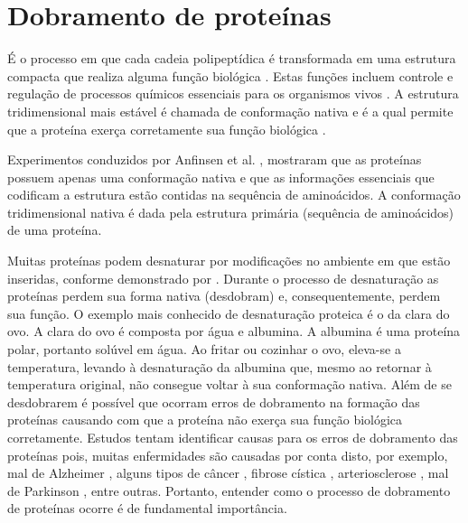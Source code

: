 
\section{Dobramento de proteínas}

É o processo em que cada cadeia polipeptídica é transformada em uma estrutura compacta que realiza alguma função biológica \cite{grantcharova2001mechanisms}. Estas funções incluem controle e regulação de processos químicos essenciais para os organismos vivos \cite{branden1999introduction}. A estrutura tridimensional mais estável é chamada de conformação nativa e é a qual permite que a proteína exerça corretamente sua função biológica \cite{lodish2000molecular, pedersen2000algorithms}.

Experimentos conduzidos por Anfinsen et al. \cite{sela1957reductive, anfinsen1972studies, anfinsen1961kinetics}, mostraram que as proteínas possuem apenas uma conformação nativa e que as informações essenciais que codificam a estrutura estão contidas na sequência de aminoácidos. A conformação tridimensional nativa é dada pela estrutura primária (sequência de aminoácidos) de uma proteína.

Muitas proteínas podem desnaturar por modificações no ambiente em que estão inseridas, conforme demonstrado por \cite{sela1957reductive, anfinsen1972studies, anfinsen1961kinetics}. Durante o processo de desnaturação as proteínas perdem sua forma nativa (desdobram) e, consequentemente, perdem sua função. O exemplo mais conhecido de desnaturação proteica é o da clara do ovo. A clara do ovo é composta por água e albumina. A albumina é uma proteína polar, portanto solúvel em 
água. Ao fritar ou cozinhar o ovo, eleva-se a temperatura, levando à desnaturação da albumina que, mesmo ao retornar à temperatura original, não consegue voltar à sua conformação nativa. Além de se desdobrarem é possível que ocorram erros de dobramento na formação das proteínas causando com que a proteína não exerça sua função biológica corretamente. Estudos tentam identificar causas para os erros de dobramento das proteínas pois, muitas enfermidades são causadas por conta disto, por exemplo, mal de Alzheimer \cite{hutton2001analysis, selkoe2001clearing}, alguns tipos de câncer \cite{bell2002p53, dawson2003n, ishimaru2003fibrillar}, fibrose cística \cite{thomas1992altered}, arteriosclerose
\cite{ursini2002atherosclerosis}, mal de Parkinson \cite{mcnaught2001failure}, entre outras. 
Portanto, entender como o processo de dobramento de proteínas ocorre é de fundamental importância. 


